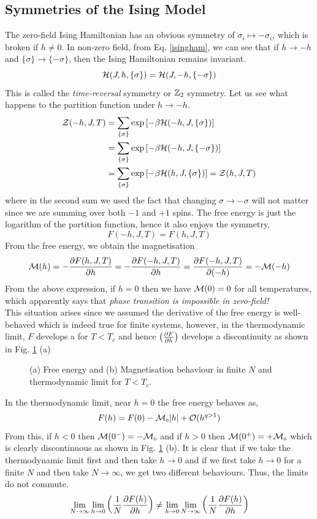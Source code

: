\subsection{Symmetries of the Ising Model}
The zero-field Ising Hamiltonian has an obvious symmetry of $\sigma_i \mapsto -\sigma_i$, which is broken if $h\neq 0$. In non-zero field, from Eq. \eqref{isingham}, we can see that if $h\to -h$ and $\{\sigma\}\to \{-\sigma\}$, then the Ising Hamiltonian remains invariant. 
$$\mathcal H(J, h, \{\sigma\}) = \mathcal H(J,-h,\{-\sigma\})$$
This is called the \textit{time-reversal} symmetry or $\mathbb{Z}_2$ symmetry. Let us see what happens to the partition function under $h\to -h$. 
\begin{align*}
    \mathcal Z(-h, J, T) &= \sum\limits_{\{\sigma\}} \exp\qty[-\beta \mathcal H(-h, J,\{\sigma\})]\\
    &=\sum\limits_{\{\sigma\}} \exp\qty[-\beta\mathcal H(-h, J,\{-\sigma\})]\\
    &=\sum\limits_{\{\sigma\}} \exp\qty[-\beta\mathcal H(h, J,\{\sigma\})]=\mathcal Z(h,J,T)
\end{align*}
where in the second sum we used the fact that changing $\sigma\to -\sigma$ will not matter since we are summing over both $-1$ and $+1$ spins. The free energy is just the logarithm of the partition function, hence it also enjoys the symmetry,
$$F(-h, J, T) = F(h, J,T)$$
From the free energy, we obtain the magnetisation  
\begin{align}
    \begin{split}
        \mathcal M(h) = -\pdv{F(h,J,T)}{h} = -\pdv{F(-h,J,T)}{h} = \pdv{F(-h,J,T)}{(-h)} = -\mathcal M(-h)
    \end{split}
\end{align} 
From the above expression, if $h=0$ then we have $\mathcal M(0) = 0$ for all temperatures, which apparently says that \textit{phase transition is impossible in zero-field!}\\[0.2cm]
This situation arises since we assumed the derivative of the free energy is well-behaved which is indeed true for finite systems, however, in the thermodynamic limit, $F$ develops a  for $T<T_c$ and hence $\qty(\pdv{F}{h})$ develops a discontinuity as shown in Fig. \ref{kink} (a)
\begin{figure}[H]
    \centering 
    
    \caption{(a) Free energy and (b) Magnetisation behaviour in finite $N$ and thermodynamic limit for $T<T_c$.}
    \label{kink}
\end{figure}
\noindent
In the thermodynamic limit, near $h=0$ the free energy behaves as,
$$F(h) = F(0) - \mathcal M_{\text{\tiny 0}} \abs{h} +\mathcal O(h^{q>1})$$
From this, if $h<0$ then $\mathcal M(0^-) = -\mathcal M_{\text{\tiny 0}}$ and if $h>0$ then $\mathcal M(0^+) = +\mathcal M_{\text{\tiny 0}}$ which is clearly discontinuous as shown in Fig. \ref{kink} (b). It is clear that if we take the thermodynamic limit first and then take $h\to 0$ and if we first take $h\to 0$ for a finite $N$ and then take $N\to \infty$, we get two different behaviours. Thus, the limits do not commute.  
$$\lim\limits_{N\to\infty}\lim\limits_{h\to 0} \qty( \frac{1}{N}\pdv{F(h)}{h})\neq \lim\limits_{h\to 0}\lim\limits_{N\to\infty} \qty( \frac{1}{N}\pdv{F(h)}{h})$$ 
